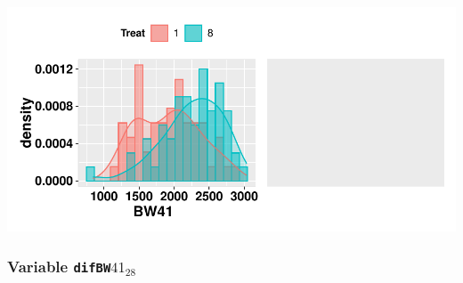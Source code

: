\documentclass[11pt,a4paper]{article}\usepackage[]{graphicx}\usepackage[]{color}
\makeatletter
\def\maxwidth{ %
  \ifdim\Gin@nat@width>\linewidth
    \linewidth
  \else
    \Gin@nat@width
  \fi
}
\newenvironment{knitrout}{}{} %
\makeatother
\begin{document}
\begin{knitrout}
\includegraphics[width=\maxwidth]{figure/unnamed-chunk-10-4} 

\end{knitrout}

\clearpage
\subsubsection{Variable \texttt{difBW$41_{28}$}}
\end{document}
